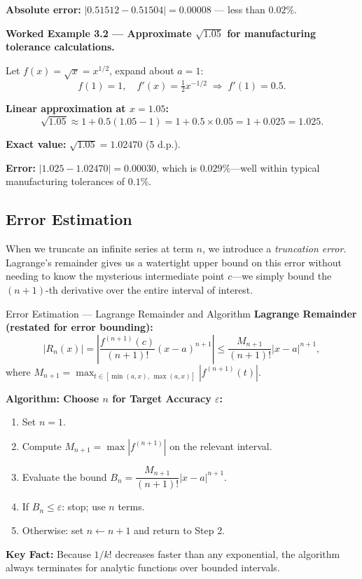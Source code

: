 \documentclass[12pt,a4paper]{article}
\begin{document}
\textbf{Absolute error:} \(|0.51512 - 0.51504| = 0.00008\) --- less than \(0.02\%\).

\medskip
\textbf{Worked Example 3.2 --- Approximate \(\sqrt{1.05}\) for manufacturing tolerance
calculations.}

Let \(f(x) = \sqrt{x} = x^{1/2}\), expand about \(a = 1\):
\[
  f(1) = 1, \quad f'(x) = \tfrac{1}{2}x^{-1/2} \;\Rightarrow\; f'(1) = 0.5.
\]

\textbf{Linear approximation at \(x = 1.05\):}
\[
  \sqrt{1.05} \approx 1 + 0.5(1.05 - 1) = 1 + 0.5 \times 0.05 = 1 + 0.025 = 1.025.
\]

\textbf{Exact value:} \(\sqrt{1.05} = 1.02470\) (5 d.p.).

\textbf{Error:} \(|1.025 - 1.02470| = 0.00030\), which is \(0.029\%\)---well within typical
manufacturing tolerances of \(0.1\%\).

\subsection{Error Estimation}

When we truncate an infinite series at term \(n\), we introduce a \emph{truncation error}.
Lagrange's remainder gives us a watertight upper bound on this error without needing to know the
mysterious intermediate point \(c\)---we simply bound the \((n+1)\)-th derivative over the
entire interval of interest.

\begin{infobox}{Error Estimation --- Lagrange Remainder and Algorithm}
\textbf{Lagrange Remainder (restated for error bounding):}
\[
  |R_n(x)| = \left|\frac{f^{(n+1)}(c)}{(n+1)!}(x-a)^{n+1}\right|
            \leq \frac{M_{n+1}}{(n+1)!}|x-a|^{n+1},
\]
where \(M_{n+1} = \max_{t \in [\min(a,x),\, \max(a,x)]}|f^{(n+1)}(t)|\).

\medskip
\textbf{Algorithm: Choose \(n\) for Target Accuracy \(\varepsilon\):}
\begin{enumerate}[leftmargin=2em, label=\textbf{Step \arabic*.}]
  \item Set \(n = 1\).
  \item Compute \(M_{n+1} = \max |f^{(n+1)}|\) on the relevant interval.
  \item Evaluate the bound \(B_n = \dfrac{M_{n+1}}{(n+1)!}|x-a|^{n+1}\).
  \item If \(B_n \leq \varepsilon\): stop; use \(n\) terms.
  \item Otherwise: set \(n \leftarrow n+1\) and return to Step 2.
\end{enumerate}

\medskip
\textbf{Key Fact:} Because \(1/k!\) decreases faster than any exponential, the algorithm
always terminates for analytic functions over bounded intervals.
\end{infobox}
\end{document}
